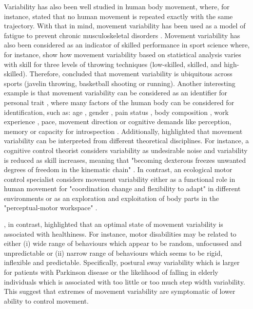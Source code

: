 Variability has also been well studied in human body movement, where, 
for instance, \cite{bernstein1967} stated that no human movement is 
repeated exactly with the same trajectory.
With that in mind, movement variability has been used as a model of fatigue 
to prevent chronic musculoskeletal disorders 
\citep{mathiassen2006, srinivasan2012}. 
Movement variability has also been considered as an indicator of skilled 
performance in sport science where, for instance, 
\cite{wagner2012} show how movement variability based on statistical 
analysis varies with skill for three levels of throwing techniques 
(low-skilled, skilled, and high-skilled).
Therefore, \cite{bartlett2007} concluded that movement variability is 
ubiquitous across sports (javelin throwing, basketball shooting or running).
Another interesting example is that movement variability can be considered 
as an identifier for personal trait \citep{sandlund2017}, 
where many factors of the human body can be considered for identification, 
such as:
age \citep{kruger2013, macdonald2006, vaillancourt2003, stergiou2016},
gender \citep{svendsen2010},
pain status \citep{madeleine2008, sandlund2008},
body composition  \citep{chiari2002},
work experience \citep{madeleine2009},
pace, movement direction or cognitive demands  
like perception, memory or capacity for introspection 
\citep{srinivasan2012, kanai2011}.
Additionally, \cite{bartlett2007} highlighted that movement variability 
can be interpreted from different theoretical disciplines.
For instance, a cognitive control theorist considers variability as 
undesirable noise and variability is reduced as skill increases, meaning 
that "becoming dexterous freezes unwanted degrees of freedom in the 
kinematic chain" \citep[p. 238]{bartlett2007}.
In contrast, an ecological motor control specialist considers movement 
variability either as a functional role in human movement for 
"coordination change and flexibility to adapt" in different 
environments \citep[p. 238]{bartlett2007} or 
as an exploration and exploitation of body parts in the 
"perceptual-motor workspace" \citep{wu2014, herzfeld2014}.

\cite{stergiou2011}, in contrast, highlighted that an optimal state 
of movement variability is associated with healthiness.
For instance, motor disabilities may be related to either 
(i) wide range of behaviours which appear to be random, unfocussed and 
unpredictable or (ii) narrow range of behaviours which seems to be rigid, 
inflexible and predictable. 
Specifically, postural sway variability which is larger for patients 
with Parkinson disease or the likelihood of falling in elderly individuals 
which is associated with too little or too much step width variability.
This suggest that extremes of movement variability are symptomatic of 
lower ability to control movement.

